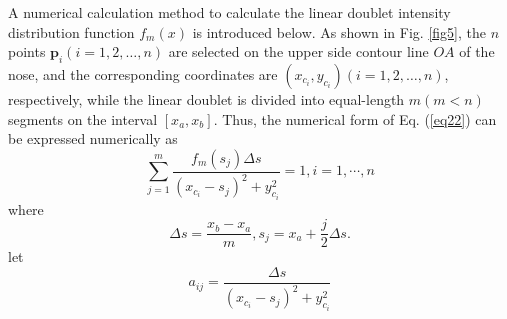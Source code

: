 A numerical calculation method to calculate the linear doublet intensity distribution function $f_m(x)$ is introduced below. As shown in Fig. \ref{fig5}, the $n$ points $\mathbf{p}_i(i=1,2,\ldots,n)$ are selected on the upper side contour line $OA$ of the nose, and the corresponding coordinates are $(x_{c_i},y_{c_i})(i=1,2,\ldots,n)$, respectively, while the linear doublet is divided into equal-length $m(m<n)$ segments on the interval $\left[ {{x_a},{x_b}} \right]$. Thus, the numerical form of Eq. (\ref{eq22}) can be expressed numerically as
\begin{equation}\label{eq23}
\sum_{j=1}^m \frac{f_m\left(s_j\right) \Delta s}{\left(x_{c_i}-s_j\right)^2+y_{c_i}^2}=1, i=1, \cdots, n
\end{equation}
where
\begin{equation}\label{eq24}
\Delta s=\frac{x_b-x_a}{m}, s_j=x_a+\frac{j}{2} \Delta s .
\end{equation}
let
\begin{equation}\label{eq25}
a_{i j}=\frac{\Delta s}{\left(x_{c_i}-s_j\right)^2+y_{c_i}^2}
\end{equation}

